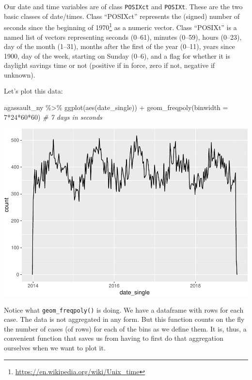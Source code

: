 \documentclass[
]{book}
\makeatletter
\newenvironment{Shaded}{\begin{snugshade}}{\end{snugshade}}
\newcommand{\AttributeTok}[1]{\textcolor[rgb]{0.61,0.61,0.61}{#1}}
\newcommand{\CommentTok}[1]{\textcolor[rgb]{0.37,0.37,0.37}{\textit{#1}}}
\newcommand{\DecValTok}[1]{\textcolor[rgb]{0.06,0.06,0.06}{#1}}
\newcommand{\FunctionTok}[1]{\textcolor[rgb]{0,0,0}{#1}}
\newcommand{\NormalTok}[1]{#1}
\newcommand{\SpecialCharTok}[1]{\textcolor[rgb]{0,0,0}{#1}}
\renewcommand{\href}[2]{#2\footnote{\url{#1}}}
\newenvironment{kframe}{%
\medskip{}
\setlength{\fboxsep}{.8em}
 \def\at@end@of@kframe{}%
 \ifinner\ifhmode%
  \def\at@end@of@kframe{\end{minipage}}%
  \begin{minipage}{\columnwidth}%
 \fi\fi%
 \def\FrameCommand##1{\hskip\@totalleftmargin \hskip-\fboxsep
 \colorbox{shadecolor}{##1}\hskip-\fboxsep
     \hskip-\linewidth \hskip-\@totalleftmargin \hskip\columnwidth}%
 \MakeFramed {\advance\hsize-\width
   \@totalleftmargin\z@ \linewidth\hsize
   \@setminipage}}%
 {\par\unskip\endMakeFramed%
 \at@end@of@kframe}
\renewenvironment{Shaded}{\begin{kframe}}{\end{kframe}}
\makeatother
\begin{document}
Our date and time variables are of class \texttt{POSIXct} and \texttt{POSIXt}. These are the two basic classes of date/times. Class ``POSIXct'' represents the (signed) \href{https://en.wikipedia.org/wiki/Unix_time}{number of seconds since the beginning of 1970} as a numeric vector. Class ``POSIXt'' is a named list of vectors representing seconds (0--61), minutes (0--59), hours (0--23), day of the month (1--31), months after the first of the year (0--11), years since 1900, day of the week, starting on Sunday (0--6), and a flag for whether it is daylight savings time or not (positive if in force, zero if not, negative if unknown).

Let's plot this data:

\begin{Shaded}
\begin{Highlighting}[]
\NormalTok{agassault\_ny }\SpecialCharTok{\%\textgreater{}\%} 
  \FunctionTok{ggplot}\NormalTok{(}\FunctionTok{aes}\NormalTok{(date\_single)) }\SpecialCharTok{+} 
  \FunctionTok{geom\_freqpoly}\NormalTok{(}\AttributeTok{binwidth =} \DecValTok{7}\SpecialCharTok{*}\DecValTok{24}\SpecialCharTok{*}\DecValTok{60}\SpecialCharTok{*}\DecValTok{60}\NormalTok{) }\CommentTok{\# 7 days in seconds}
\end{Highlighting}
\end{Shaded}

\includegraphics{crime_mapping_files/figure-latex/ggplot_8b-1.pdf}

Notice what \texttt{geom\_freqpoly()} is doing. We have a dataframe with rows for each case. The data is not aggregated in any form. But this function counts on the fly the number of cases (of rows) for each of the bins as we define them. It is, thus, a convenient function that saves us from having to first do that aggregation ourselves when we want to plot it.
\end{document}
